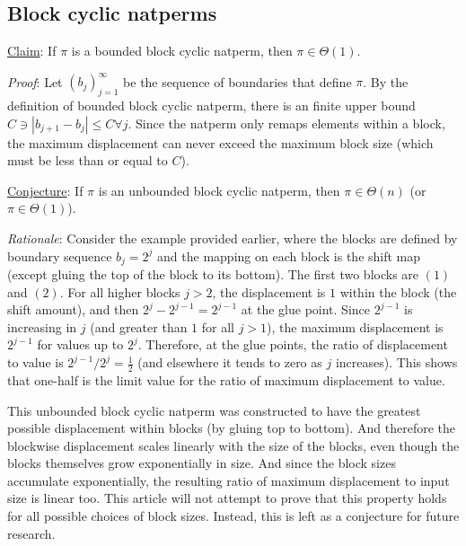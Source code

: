 \documentclass[12pt,reqno]{article}
\begin{document}
\subsection{Block cyclic natperms}

\underline{Claim}: If $\pi$ is a bounded block cyclic natperm, then $\pi \in \Theta(1)$.

\textit{Proof}: Let $(b_j)_{j=1}^{\infty}$ be the sequence of boundaries that define $\pi$. By the definition of bounded block cyclic natperm, there is an finite upper bound $C \ni | b_{j+1} - b_j | \leq C \forall j$. Since the natperm only remaps elements within a block, the maximum displacement can never exceed the maximum block size (which must be less than or equal to $C$).

\underline{Conjecture}: If $\pi$ is an unbounded block cyclic natperm, then $\pi \in \Theta(n)$ (or $\pi \in \Theta(1)$).

\textit{Rationale}: Consider the example provided earlier, where the blocks are defined by boundary sequence $b_j = 2^j$ and the mapping on each block is the shift map (except gluing the top of the block to its bottom). The first two blocks are $(1)$ and $(2)$. For all higher blocks $j > 2$, the displacement is $1$ within the block (the shift amount), and then $2^j - 2^{j-1} = 2^{j-1}$ at the glue point. Since $2^{j-1}$ is increasing in $j$ (and greater than $1$ for all $j > 1$), the maximum displacement is $2^{j-1}$ for values up to $2^j$. Therefore, at the glue points, the ratio of displacement to value is $2^{j-1} / 2^j = \frac{1}{2}$ (and elsewhere it tends to zero as $j$ increases). This shows that one-half is the limit value for the ratio of maximum displacement to value.

This unbounded block cyclic natperm was constructed to have the greatest possible displacement within blocks (by gluing top to bottom). And therefore the blockwise displacement scales linearly with the size of the blocks, even though the blocks themselves grow exponentially in size. And since the block sizes accumulate exponentially, the resulting ratio of maximum displacement to input size is linear too. This article will not attempt to prove that this property holds for all possible choices of block sizes. Instead, this is left as a conjecture for future research.
\end{document}
